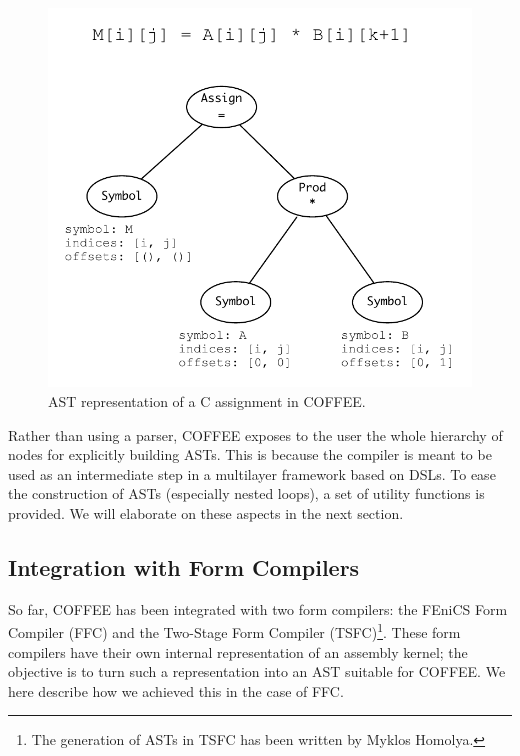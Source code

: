 \begin{figure}
\begin{center}
\includegraphics[scale=0.50]{coffee/pictures/coffee-ast.pdf}
\caption{AST representation of a C assignment in COFFEE.}
\label{fig:coffee-ast-vs-c}
\end{center}
\end{figure}

Rather than using a parser, COFFEE exposes to the user the whole hierarchy of nodes for explicitly building ASTs. This is because the compiler is meant to be used as an intermediate step in a multilayer framework based on DSLs. To ease the construction of ASTs (especially nested loops), a set of utility functions is provided. We will elaborate on these aspects in the next section.

\subsection{Integration with Form Compilers}
So far, COFFEE has been integrated with two form compilers: the FEniCS Form Compiler (FFC) and the Two-Stage Form Compiler (TSFC)\footnote{The generation of ASTs in TSFC has been written by Myklos Homolya.}. These form compilers have their own internal representation of an assembly kernel; the objective is to turn such a representation into an AST suitable for COFFEE. We here describe how we achieved this in the case of FFC.

